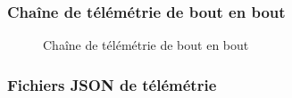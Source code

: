 \subsubsection{Chaîne de télémétrie de bout en bout}

\begin{figure}[htbp]
\centering
\resizebox{0.95\textwidth}{!}{%
}
\caption{Chaîne de télémétrie de bout en bout}
\label{fig-argos-flux-telemetrie}
\tablesourcepromoteurs

\end{figure}

\subsubsection{Fichiers JSON de télémétrie}


